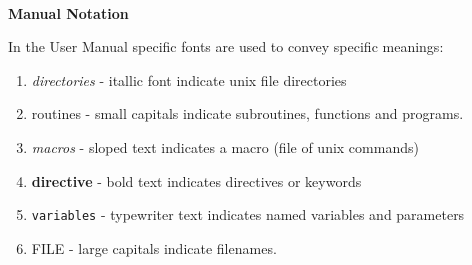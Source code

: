 
~

\vspace{1.5 in}
\centerline{{\bf Manual Notation}}
\vspace{1 in}
In the \D{} User Manual specific fonts are used to
convey specific meanings:
\begin{enumerate}
\item {\em directories} - itallic font indicate unix file directories
\item {\sc routines} - small capitals indicate subroutines, functions and
programs.
\item {\sl macros} - sloped text indicates a macro (file of unix commands)
\item {\bf directive} - bold text indicates directives or keywords
\item {\tt variables} - typewriter text indicates named variables and parameters
\item {FILE} - large capitals indicate filenames.
\end{enumerate}

\clearpage
